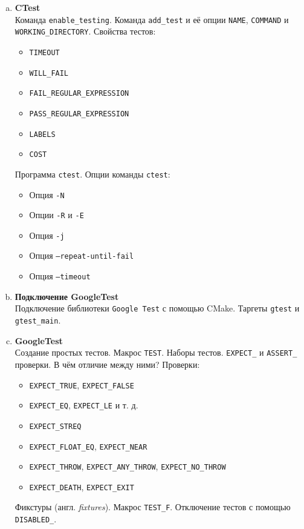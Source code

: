 \documentclass{article}
\begin{document}
\begin{enumerate}
\begin{enumerate}[a.]
\item \textbf{CTest}\\
Команда \texttt{enable\_testing}. Команда \texttt{add\_test} и её опции \texttt{NAME}, \texttt{COMMAND} и \texttt{WORKING\_DIRECTORY}. Свойства тестов:
\begin{itemize}
\item \texttt{TIMEOUT}
\item \texttt{WILL\_FAIL}
\item \texttt{FAIL\_REGULAR\_EXPRESSION}
\item \texttt{PASS\_REGULAR\_EXPRESSION}
\item \texttt{LABELS}
\item \texttt{COST}
\end{itemize}

Программа \texttt{ctest}. Опции команды \texttt{ctest}: 
\begin{itemize}
\item Опция \texttt{-N}
\item Опции \texttt{-R} и \texttt{-E}
\item Опция \texttt{-j}
\item Опция \texttt{--repeat-until-fail}
\item Опция \texttt{--timeout}
\end{itemize}

\item \textbf{Подключение GoogleTest}\\
Подключение библиотеки \texttt{Google Test} с помощью CMake.
Таргеты \texttt{gtest} и \texttt{gtest\_main}.

\item \textbf{GoogleTest}\\
Создание простых тестов. Макрос \texttt{TEST}. Наборы тестов.
\texttt{EXPECT\_} и \texttt{ASSERT\_} проверки. В чём отличие между ними?
Проверки:
\begin{itemize}
\item \texttt{EXPECT\_TRUE}, \texttt{EXPECT\_FALSE}
\item \texttt{EXPECT\_EQ}, \texttt{EXPECT\_LE} и т. д.
\item \texttt{EXPECT\_STREQ}
\item \texttt{EXPECT\_FLOAT\_EQ}, \texttt{EXPECT\_NEAR}
\item \texttt{EXPECT\_THROW}, \texttt{EXPECT\_ANY\_THROW}, \texttt{EXPECT\_NO\_THROW}
\item \texttt{EXPECT\_DEATH}, \texttt{EXPECT\_EXIT}
\end{itemize}
Фикстуры (англ. \textit{fixtures}). Макрос \texttt{TEST\_F}. Отключение тестов с помощью \texttt{DISABLED\_}.


\end{enumerate}
\end{enumerate}
\end{document}
